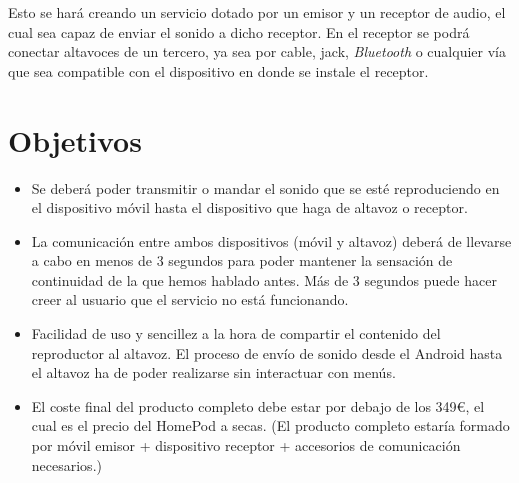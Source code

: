 Esto se hará creando un servicio dotado por un emisor y un receptor de audio, el
cual sea capaz de enviar el sonido a dicho receptor. En el receptor se podrá
conectar altavoces de un tercero, ya sea por cable, jack, \emph{Bluetooth} o
cualquier vía que sea compatible con el dispositivo en donde se instale el
receptor.

\section{Objetivos}
\begin{itemize}
    \item Se deberá poder transmitir o mandar el sonido que se esté
    reproduciendo en el dispositivo móvil hasta el dispositivo que haga de
    altavoz o receptor.
    \item La comunicación entre ambos dispositivos (móvil y altavoz) deberá de
    llevarse a cabo en menos de 3 segundos para poder mantener la sensación de
    continuidad de la que hemos hablado antes. Más de 3 segundos puede hacer
    creer al usuario que el servicio no está funcionando.
    \item Facilidad de uso y sencillez a la hora de compartir el contenido del
    reproductor al altavoz. El proceso de envío de sonido desde el Android hasta
    el altavoz ha de poder realizarse sin interactuar con menús.
    \item El coste final del producto completo debe estar por debajo de los
    349€, el cual es el precio del HomePod a secas. (El producto completo
    estaría formado por móvil emisor + dispositivo receptor + accesorios de
    comunicación necesarios.)
\end{itemize}

